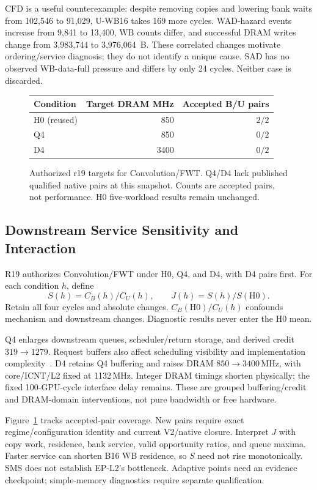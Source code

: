 \documentclass[conference,letterpaper]{IEEEtran}
\begin{document}
CFD is a useful counterexample: despite removing copies and lowering bank waits from 102,546 to 91,029, U-WB16 takes 169 more cycles. WAD-hazard events increase from 9,841 to 13,400, WB counts differ, and successful DRAM writes change from 3,983,744 to 3,976,064~B. These correlated changes motivate ordering/service diagnosis; they do not identify a unique cause. SAD has no observed WB-data-full pressure and differs by only 24 cycles. Neither case is discarded.

\begin{figure}[t]
\centering\footnotesize
\begin{tabular}{@{}lrr@{}}
\toprule
Condition & Target DRAM MHz & Accepted B/U pairs \\
\midrule
H0 (reused) & 850 & $2/2$ \\
Q4 & 850 & $0/2$ \\
D4 & 3400 & $0/2$ \\
\bottomrule
\end{tabular}
\caption{Authorized r19 targets for Convolution/FWT. Q4/D4 lack published qualified native pairs at this snapshot. Counts are accepted pairs, not performance. H0 five-workload results remain unchanged.}
\label{fig:controls}
\end{figure}

\subsection{Downstream Service Sensitivity and Interaction}
R19 authorizes Convolution/FWT under H0, Q4, and D4, with D4 pairs first. For each condition $h$, define
\begin{equation}
 S(h)=C_B(h)/C_U(h),\qquad J(h)=S(h)/S(\mathrm{H0}).
\end{equation}
Retain all four cycles and absolute changes. $C_B(\mathrm{H0})/C_U(h)$ confounds mechanism and downstream changes. Diagnostic results never enter the H0 mean.

Q4 enlarges downstream queues, scheduler/return storage, and derived credit $319\to1279$. Request buffers also affect scheduling visibility and implementation complexity~\cite{sms}. D4 retains Q4 buffering and raises DRAM $850\to3400$\,MHz, with core/ICNT/L2 fixed at 1132\,MHz. Integer DRAM timings shorten physically; the fixed 100-GPU-cycle interface delay remains. These are grouped buffering/credit and DRAM-domain interventions, not pure bandwidth or free hardware.

Figure~\ref{fig:controls} tracks accepted-pair coverage. New pairs require exact regime/configuration identity and current V2/native closure. Interpret $J$ with copy work, residence, bank service, valid opportunity ratios, and queue maxima. Faster service can shorten B16 WB residence, so $S$ need not rise monotonically. SMS does not establish EP-L2's bottleneck. Adaptive points need an evidence checkpoint; simple-memory diagnostics require separate qualification.
\end{document}
